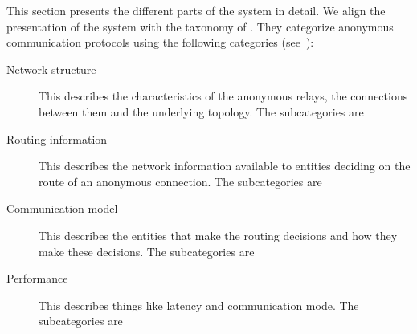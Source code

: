 This section presents the different parts of the system in detail.
We align the presentation of the system with the taxonomy of 
\textcite{RoutingSurveyAnonymousProtocols}.
They categorize anonymous communication protocols using the following 
categories (see~\cite[Table 1]{RoutingSurveyAnonymousProtocols}):
\begin{description}
  \item[Network structure]
    This describes the characteristics of the anonymous relays, the connections 
    between them and the underlying topology.
    The subcategories are

  \item[Routing information]
    This describes the network information available to entities deciding on 
    the route of an anonymous connection.
    The subcategories are

  \item[Communication model]
    This describes the entities that make the routing decisions and how they 
    make these decisions.
    The subcategories are

  \item[Performance]
    This describes things like latency and communication mode.
    The subcategories are
\end{description}

